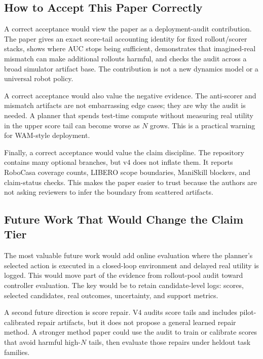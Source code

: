 \subsection{How to Accept This Paper Correctly}
\label{app:accept-correctly}

A correct acceptance would view the paper as a deployment-audit contribution.
The paper gives an exact score-tail accounting identity for fixed
rollout/scorer stacks, shows where AUC stops being sufficient, demonstrates
that imagined-real mismatch can make additional rollouts harmful, and checks
the audit across a broad simulator artifact base. The contribution is not a
new dynamics model or a universal robot policy.

A correct acceptance would also value the negative evidence. The anti-scorer
and mismatch artifacts are not embarrassing edge cases; they are why the audit
is needed. A planner that spends test-time compute without measuring real
utility in the upper score tail can become worse as $N$ grows. This is a
practical warning for WAM-style deployment.

Finally, a correct acceptance would value the claim discipline. The repository
contains many optional branches, but v4 does not inflate them. It reports
RoboCasa coverage counts, LIBERO scope boundaries, ManiSkill blockers, and
claim-status checks. This makes the paper easier to trust because the authors
are not asking reviewers to infer the boundary from scattered artifacts.

\subsection{Future Work That Would Change the Claim Tier}
\label{app:future-tier-change}

The most valuable future work would add online evaluation where the planner's
selected action is executed in a closed-loop environment and delayed real
utility is logged. This would move part of the evidence from rollout-pool audit
toward controller evaluation. The key would be to retain candidate-level logs:
scores, selected candidates, real outcomes, uncertainty, and support metrics.

A second future direction is score repair. V4 audits score tails and includes
pilot-calibrated repair artifacts, but it does not propose a general learned
repair method. A stronger method paper could use the audit to train or calibrate
scores that avoid harmful high-$N$ tails, then evaluate those repairs under
heldout task families.

